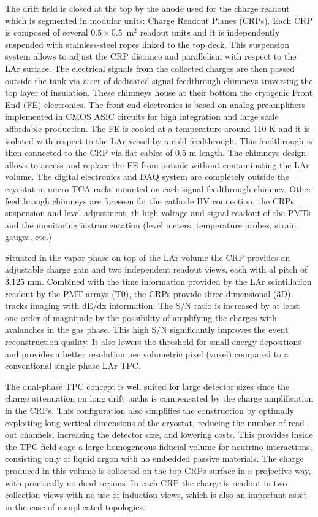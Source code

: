 The drift field is closed at the top by the anode used for the charge readout which is segmented in modular units: Charge Readout Planes (CRPs). Each CRP is composed of several  $0.5\times 0.5$~m$^2$ readout units and it  is independently suspended with stainless-steel ropes linked to the top deck. This suspension system allows to adjust the CRP distance and parallelism with respect to the LAr surface. The electrical signals from the collected charges are then passed outside the tank via a set of dedicated signal feedthrough chimneys traversing the top layer of insulation. These chimneys house at their bottom the cryogenic  Front End (FE) electronics.  The front-end electronics is based on analog preamplifiers implemented in CMOS ASIC circuits for high integration and large scale affordable production. The FE  is cooled at a temperature around 110 K and it is isolated with respect to the LAr vessel by a cold feedthrough. This feedthrough is then connected to the CRP via flat cables of 0.5 m length. The chimneys design allows to access and replace the FE from outside without contaminating the LAr volume. The digital electronics and DAQ system are completely outside the cryostat in micro-TCA racks mounted on each signal feedthrough chimney. Other feedthrough chimneys are foreseen for the cathode HV connection, the CRPs suspension and level adjustment, th high voltage and signal readout of the PMTs and the monitoring instrumentation (level meters, temperature probes, strain gauges, etc.)

Situated in the vapor phase on top of the LAr volume the CRP  provides an adjustable charge gain and two independent readout views, each with al pitch of 3.125 mm.  Combined with the time information provided by the LAr scintillation readout by the PMT arrays (T0), the CRPs provide three-dimensional (3D) tracks imaging with dE/dx information. The S/N ratio is increased by at least one order of magnitude by the possibility of amplifying the charges with avalanches in the gas phase.  This high S/N significantly improves the event reconstruction quality. It also lowers the threshold for small energy depositions and provides a better resolution per volumetric pixel (voxel) compared to a conventional single-phase LAr-TPC. 

The dual-phase TPC concept is well suited for large detector sizes since the charge attenuation on long drift paths is compensated by the charge amplification in the CRPs.  This configuration also simplifies the construction by optimally exploiting long vertical dimensions of the cryostat, reducing the number of read-out channels, increasing the detector size, and lowering costs.  This provides inside the TPC field cage a large homogeneous fiducial volume for neutrino interactions, consisting only of liquid argon with no embedded passive materials. The charge produced in this volume is collected on the top CRPs surface in a projective way, with practically no dead regions. In each CRP the charge is readout in two collection views with no use of induction views, which is also an important asset in the case of complicated topologies. 

